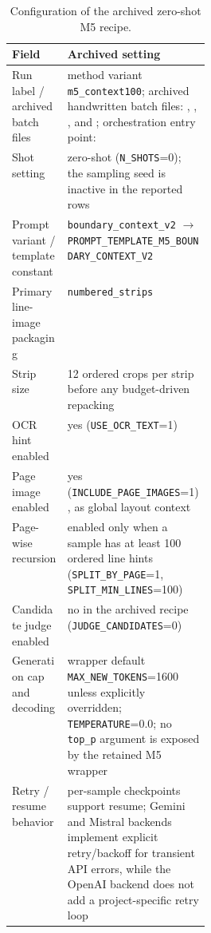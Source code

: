 \begin{table}[t]
  \centering
  \caption{Configuration of the archived zero-shot M5 \contextHundred{} recipe.}
  \label{tab:method_m5_context_rich_config}
  \footnotesize
  \renewcommand{\arraystretch}{1.08}
  \begin{tabularx}{\linewidth}{@{}p{0.29\linewidth}Y@{}}
    \toprule
    \textbf{Field} & \textbf{Archived setting} \\
    \midrule
    Run label / archived batch files & method variant \texttt{m5\_context100}; archived handwritten batch files: , , , and ; orchestration entry point:  \\
    Shot setting & zero-shot (\texttt{N\_SHOTS}=0); the sampling seed is inactive in the reported rows \\
    Prompt variant / template constant & \texttt{boundary\_context\_v2} \(\rightarrow\) \texttt{PROMPT\_TEMPLATE\_M5\_BOUNDARY\_CONTEXT\_V2} \\
    Primary line-image packaging & \texttt{numbered\_strips} \\
    Strip size & 12 ordered crops per strip before any budget-driven repacking \\
    OCR hint enabled & yes (\texttt{USE\_OCR\_TEXT}=1) \\
    Page image enabled & yes (\texttt{INCLUDE\_PAGE\_IMAGES}=1), as global layout context \\
    Page-wise recursion & enabled only when a sample has at least 100 ordered line hints (\texttt{SPLIT\_BY\_PAGE}=1, \texttt{SPLIT\_MIN\_LINES}=100) \\
    Candidate judge enabled & no in the archived recipe (\texttt{JUDGE\_CANDIDATES}=0) \\
    Generation cap and decoding & wrapper default \texttt{MAX\_NEW\_TOKENS}=1600 unless explicitly overridden; \texttt{TEMPERATURE}=0.0; no \texttt{top\_p} argument is exposed by the retained M5 wrapper \\
    Retry / resume behavior & per-sample checkpoints support resume; Gemini and Mistral backends implement explicit retry/backoff for transient API errors, while the OpenAI backend does not add a project-specific retry loop \\

\end{tabularx}
\end{table}
